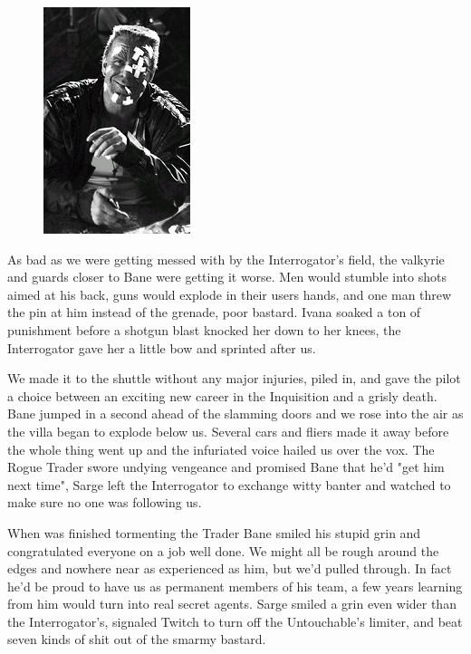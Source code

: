 \begin{figure}
	\begin{center}
		\includegraphics[width=\figwidth]{pics/9/49.png}
	\end{center}
\end{figure}
As bad as we were getting messed with by the Interrogator's field, the valkyrie and guards closer to Bane were getting it worse. 
Men would stumble into shots aimed at his back, guns would explode in their users hands, and one man threw the pin at him instead of the grenade, poor bastard. 
Ivana soaked a ton of punishment before a shotgun blast knocked her down to her knees, the Interrogator gave her a little bow and sprinted after us.

We made it to the shuttle without any major injuries, piled in, and gave the pilot a choice between an exciting new career in the Inquisition and a grisly death. 
Bane jumped in a second ahead of the slamming doors and we rose into the air as the villa began to explode below us. 
Several cars and fliers made it away before the whole thing went up and the infuriated voice hailed us over the vox. 
The Rogue Trader swore undying vengeance and promised Bane that he'd "get him next time", Sarge left the Interrogator to exchange witty banter and watched to make sure no one was following us.

When was finished tormenting the Trader Bane smiled his stupid grin and congratulated everyone on a job well done. 
We might all be rough around the edges and nowhere near as experienced as him, but we'd pulled through. 
In fact he'd be proud to have us as permanent members of his team, a few years learning from him would turn into real secret agents. 
Sarge smiled a grin even wider than the Interrogator's, signaled Twitch to turn off the Untouchable's limiter, and beat seven kinds of shit out of the smarmy bastard.

